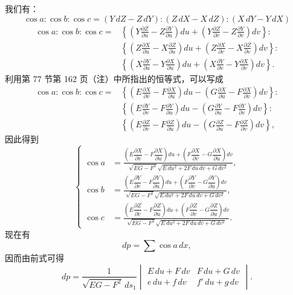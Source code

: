 我们有：
\[
 \cos a:\cos b:\cos c=(Y\,dZ-Z\,dY):(Z\,dX-X\,dZ):(X\,dY-Y\,dX)
\]
\[
\begin{aligned}
\cos a:\cos b:\cos c={}&
\left\{\left(Y\frac{\partial Z}{\partial u}-Z\frac{\partial Y}{\partial u}\right)du+\left(Y\frac{\partial Z}{\partial v}-Z\frac{\partial Y}{\partial v}\right)dv\right\}:\\
&\left\{\left(Z\frac{\partial X}{\partial u}-X\frac{\partial Z}{\partial u}\right)du+\left(Z\frac{\partial X}{\partial v}-X\frac{\partial Z}{\partial v}\right)dv\right\}:\\
&\left\{\left(X\frac{\partial Y}{\partial u}-Y\frac{\partial X}{\partial u}\right)du+\left(X\frac{\partial Y}{\partial v}-Y\frac{\partial X}{\partial v}\right)dv\right\}.
\end{aligned}
\]
利用第 77 节第 162 页（注）中所指出的恒等式，可以写成
\[
\begin{aligned}
\cos a:\cos b:\cos c={}&
\left\{\left(E\frac{\partial X}{\partial v}-F\frac{\partial X}{\partial u}\right)du-\left(G\frac{\partial X}{\partial u}-F\frac{\partial X}{\partial v}\right)dv\right\}:\\
&\left\{\left(E\frac{\partial Y}{\partial v}-F\frac{\partial Y}{\partial u}\right)du-\left(G\frac{\partial Y}{\partial u}-F\frac{\partial Y}{\partial v}\right)dv\right\}:\\
&\left\{\left(E\frac{\partial Z}{\partial v}-F\frac{\partial Z}{\partial u}\right)du-\left(G\frac{\partial Z}{\partial u}-F\frac{\partial Z}{\partial v}\right)dv\right\},
\end{aligned}
\]
因此得到
\begin{equation}\tag{6}
\left\{
\begin{aligned}
\cos a&=\frac{\left(E\dfrac{\partial X}{\partial v}-F\dfrac{\partial X}{\partial u}\right)du+\left(F\dfrac{\partial X}{\partial v}-G\dfrac{\partial X}{\partial u}\right)dv}{\sqrt{EG-F^2}\sqrt{E\,du^2+2F\,du\,dv+G\,dv^2}},\\[0.6em]
\cos b&=\frac{\left(E\dfrac{\partial Y}{\partial v}-F\dfrac{\partial Y}{\partial u}\right)du+\left(F\dfrac{\partial Y}{\partial v}-G\dfrac{\partial Y}{\partial u}\right)dv}{\sqrt{EG-F^2}\sqrt{E\,du^2+2F\,du\,dv+G\,dv^2}},\\[0.6em]
\cos c&=\frac{\left(E\dfrac{\partial Z}{\partial v}-F\dfrac{\partial Z}{\partial u}\right)du+\left(F\dfrac{\partial Z}{\partial v}-G\dfrac{\partial Z}{\partial u}\right)dv}{\sqrt{EG-F^2}\sqrt{E\,du^2+2F\,du\,dv+G\,dv^2}}.
\end{aligned}
\right.
\end{equation}
现在有
\[
 dp=\sum \cos a\,dx,
\]
因而由前式可得
\begin{equation}\tag{7}
 dp=\frac1{\sqrt{EG-F^2}\,ds_1}
 \begin{vmatrix}
 E\,du+F\,dv & F\,du+G\,dv\\
 e\,du+f\,dv & f'\,du+g\,dv
 \end{vmatrix}.
\end{equation}

